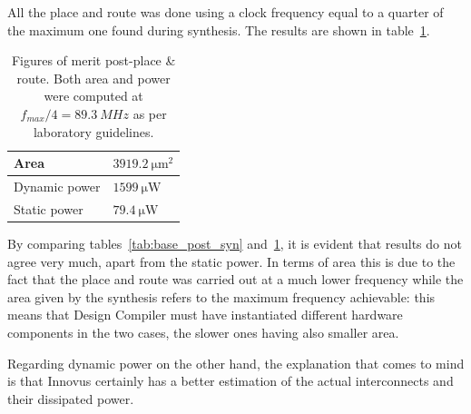 \documentclass[a4paper]{article}
\begin{document}
All the place and route was done using a clock frequency equal to a quarter of the maximum one found during synthesis. The results are shown in table~\ref{tab:base_post_pnr}.

\begin{table}[hbtp]
    \centering
    \begin{tabular}{|l|l|}
    \hline
    Area          & $\SI{3919.2}{\micro\meter^2}$   \\ \hline
    Dynamic power & $\SI{1599}{\micro\watt}$        \\ \hline
    Static power  & $\SI{79.4}{\micro\watt}$        \\ \hline
    \end{tabular}
    \caption{Figures of merit post-place \& route. Both area and power were computed at $f_{max}/4 = \SI{89.3}{MHz}$ as per laboratory guidelines.}
    \label{tab:base_post_pnr}
\end{table}

By comparing tables~\ref{tab:base_post_syn} and~\ref{tab:base_post_pnr}, it is evident that results do not agree very much, apart from the static power. In terms of area this is due to the fact that the place and route was carried out at a much lower frequency while the area given by the synthesis refers to the maximum frequency achievable: this means that Design Compiler must have instantiated different hardware components in the two cases, the slower ones having also smaller area. 

Regarding dynamic power on the other hand, the explanation that comes to mind is that Innovus certainly has a better estimation of the actual interconnects and their dissipated power.
\end{document}
